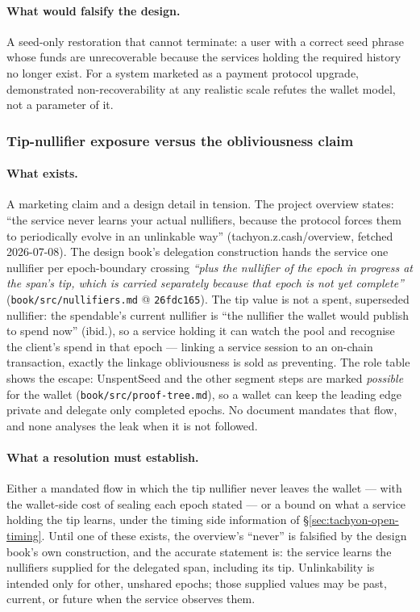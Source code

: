 \documentclass[11pt,a4paper]{article}
\theoremstyle{definition}
\begin{document}
\paragraph{What would falsify the design.} A seed-only restoration that
cannot terminate: a user with a correct seed phrase whose funds are
unrecoverable because the services holding the required history no longer
exist. For a system marketed as a payment protocol upgrade, demonstrated
non-recoverability at any realistic scale refutes the wallet model, not a
parameter of it.

\subsubsection{Tip-nullifier exposure versus the obliviousness claim}
\label{sec:tachyon-open-tip}

\paragraph{What exists.} A marketing claim and a design detail in tension.
The project overview states: ``the service never learns your actual
nullifiers, because the protocol forces them to periodically evolve in an
unlinkable way'' (tachyon.z.cash/overview, fetched 2026-07-08). The design
book's delegation construction hands the service one nullifier per
epoch-boundary crossing \emph{``plus the nullifier of the epoch in progress
at the span's tip, which is carried separately because that epoch is not
yet complete''} (\texttt{book/src/nullifiers.md} @ \texttt{26fdc165}). The
tip value is not a spent, superseded nullifier: the spendable's current
nullifier is ``the nullifier the wallet would publish to spend now''
(ibid.), so a service holding it can watch the pool and recognise the
client's spend in that epoch --- linking a service session to an on-chain
transaction, exactly the linkage obliviousness is sold as preventing. The
role table shows the escape: \textsf{UnspentSeed} and the other segment
steps are marked \emph{possible} for the wallet
(\texttt{book/src/proof-tree.md}), so a wallet can keep the leading edge
private and delegate only completed epochs. No document mandates that flow,
and none analyses the leak when it is not followed.

\paragraph{What a resolution must establish.} Either a mandated flow in
which the tip nullifier never leaves the wallet --- with the wallet-side
cost of sealing each epoch stated --- or a bound on what a service holding
the tip learns, under the timing side information of
\S\ref{sec:tachyon-open-timing}. Until one of these exists, the overview's
``never'' is falsified by the design book's own construction, and the
accurate statement is: the service learns the nullifiers supplied for
the delegated span, including its tip. Unlinkability is intended only
for other, unshared epochs; those supplied values may be past, current,
or future when the service observes them.
\end{document}
